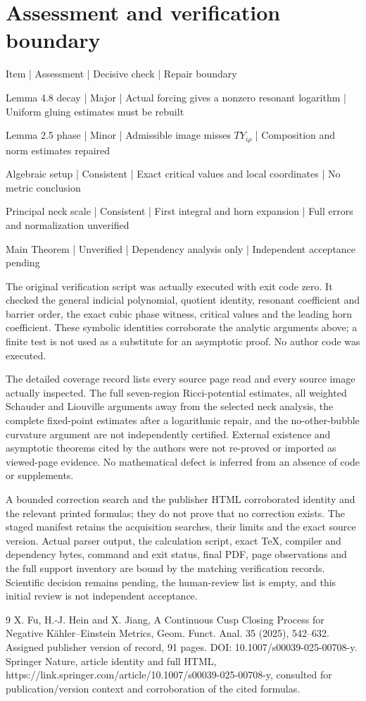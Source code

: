 \documentclass[10pt]{article}
\begin{document}
\section*{Assessment and verification boundary}
Item | Assessment | Decisive check | Repair boundary\par
Lemma 4.8 decay | Major | Actual forcing gives a nonzero resonant logarithm | Uniform gluing estimates must be rebuilt\par
Lemma 2.5 phase | Minor | Admissible image misses \(TY_{i\rho}\) | Composition and norm estimates repaired\par
Algebraic setup | Consistent | Exact critical values and local coordinates | No metric conclusion\par
Principal neck scale | Consistent | First integral and horn expansion | Full errors and normalization unverified\par
Main Theorem | Unverified | Dependency analysis only | Independent acceptance pending\par
The original verification script was actually executed with exit code zero. It checked the general indicial polynomial, quotient identity, resonant coefficient and barrier order, the exact cubic phase witness, critical values and the leading horn coefficient. These symbolic identities corroborate the analytic arguments above; a finite test is not used as a substitute for an asymptotic proof. No author code was executed.\par
The detailed coverage record lists every source page read and every source image actually inspected. The full seven-region Ricci-potential estimates, all weighted Schauder and Liouville arguments away from the selected neck analysis, the complete fixed-point estimates after a logarithmic repair, and the no-other-bubble curvature argument are not independently certified. External existence and asymptotic theorems cited by the authors were not re-proved or imported as viewed-page evidence. No mathematical defect is inferred from an absence of code or supplements.\par
A bounded correction search and the publisher HTML corroborated identity and the relevant printed formulas; they do not prove that no correction exists. The staged manifest retains the acquisition searches, their limits and the exact source version. Actual parser output, the calculation script, exact TeX, compiler and dependency bytes, command and exit status, final PDF, page observations and the full support inventory are bound by the matching verification records. Scientific decision remains pending, the human-review list is empty, and this initial review is not independent acceptance.\par
9 X. Fu, H.-J. Hein and X. Jiang, A Continuous Cusp Closing Process for Negative Kähler–Einstein Metrics, Geom. Funct. Anal. 35 (2025), 542–632. Assigned publisher version of record, 91 pages. DOI: 10.1007/s00039-025-00708-y. Springer Nature, article identity and full HTML, https://link.springer.com/article/10.1007/s00039-025-00708-y, consulted for publication/version context and corroboration of the cited formulas.\par
\end{document}
